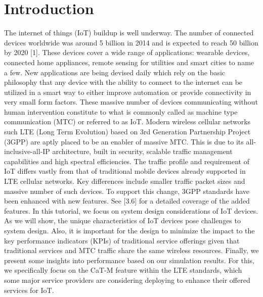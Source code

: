 \documentclass[conference,compsoc]{IEEEtran}
\begin{document}
\section{Introduction}
The internet of things (IoT) buildup is well underway. The number of connected devices worldwide was around 5 billion in 2014 and is expected to reach 50 billion by 2020 [1]. These devices cover a wide range of applications:  wearable devices, connected home appliances, remote sensing for utilities and smart cities to name a few. New applications are being devised daily which rely on the basic philosophy that any device with the ability to connect to the internet can be utilized in a smart way to either improve automation or provide connectivity in very small form factors. These massive number of devices communicating without human intervention constitute to what is commonly called as machine type communication (MTC) or referred to as IoT. Modern wireless cellular networks such LTE (Long Term Evolution) based on 3rd Generation Partnership Project (3GPP) are aptly placed to be an enabler of massive MTC. This is due to its all-inclusive-all-IP architecture, built in security, scalable traffic management capabilities and high spectral efficiencies.
The traffic profile and requirement of IoT differs vastly from that of traditional mobile devices already supported in LTE cellular networks. Key differences include smaller traffic packet sizes and massive number of such devices. To support this change, 3GPP standards have been enhanced with new features. See [3.6] for a detailed coverage of the added features.
In this tutorial, we focus on system design considerations of IoT devices. As we will show, the unique characteristics of IoT devices pose challenges to system design.  Also, it is important for  the design to minimize the impact to the key performance indicators (KPIs) of traditional service offerings given that  traditional services and MTC traffic share the same wireless resources. Finally, we present some insights into performance based on our simulation results. For this, we specifically focus on the CaT-M feature within the LTE standards, which some major service providers are considering deploying to enhance their offered services for IoT.


 
\end{document}
